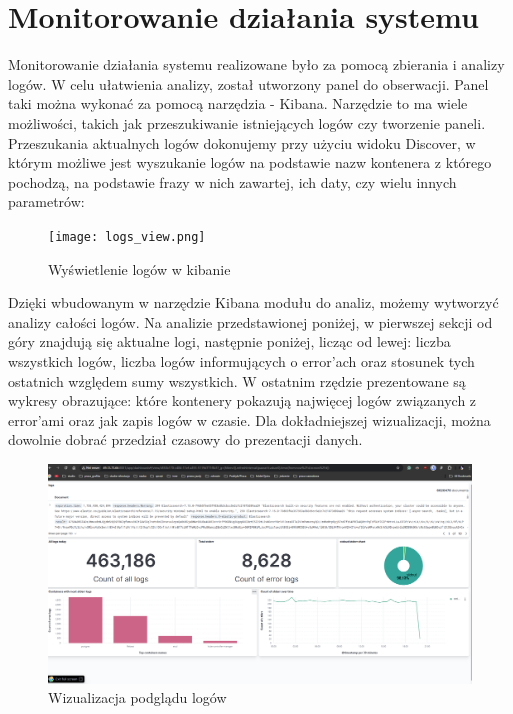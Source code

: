 \newpage
\section{Monitorowanie działania systemu}
Monitorowanie działania systemu realizowane było  za pomocą zbierania i analizy logów. W celu ułatwienia analizy,  został utworzony panel do obserwacji. Panel taki można wykonać za pomocą narzędzia - Kibana. Narzędzie to ma wiele możliwości, takich jak przeszukiwanie istniejących logów czy tworzenie paneli. Przeszukania  aktualnych logów dokonujemy przy użyciu widoku Discover, w którym możliwe jest  wyszukanie logów na podstawie nazw kontenera z którego pochodzą, na podstawie frazy w nich zawartej, ich daty, czy wielu innych parametrów:
\begin{figure}[H]
    \centering
    \texttt{[image: logs\_view.png]}
    \caption{Wyświetlenie logów w kibanie}
    \label{fig:kibana-logs}
\end{figure}

Dzięki wbudowanym w narzędzie Kibana modułu do analiz, możemy wytworzyć analizy całości logów. Na analizie przedstawionej poniżej,  w pierwszej sekcji od góry znajdują się aktualne logi, następnie poniżej, licząc od lewej: liczba wszystkich logów, liczba logów informujących o error'ach oraz stosunek tych ostatnich względem sumy wszystkich. W ostatnim rzędzie prezentowane są  wykresy obrazujące: które kontenery pokazują najwięcej logów związanych z error'ami oraz jak zapis logów w czasie. Dla dokładniejszej wizualizacji, można dowolnie dobrać przedział czasowy do prezentacji danych.
\begin{figure}[H]
    \centering
    \includegraphics[width=1\linewidth]{img/monitor-dashboard.png}
    \caption{Wizualizacja podglądu logów}
    \label{fig:logs_dashboard}
\end{figure}